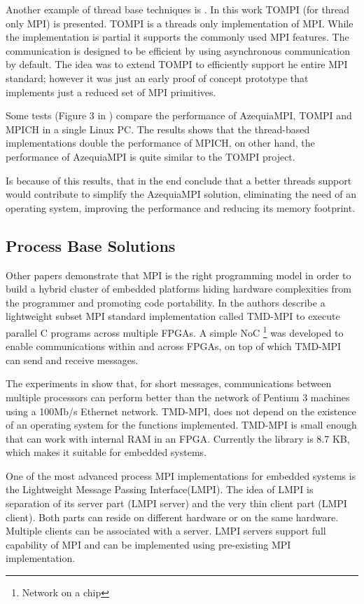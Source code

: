 Another example of thread base techniques is \cite{Demaine} . In this work
TOMPI (for thread only MPI) is presented. TOMPI is a threads only
implementation of MPI. While the implementation is partial it supports the
commonly used MPI features. The communication is designed to be efficient by
using asynchronous communication by default. The idea was to extend TOMPI to
efficiently support he entire MPI standard; however it was just an early proof
of concept prototype that implements just a reduced set of MPI primitives. 

Some tests (Figure 3 in \cite{Gallego}) compare the performance of AzequiaMPI,
TOMPI and MPICH in a single Linux PC. The results shows that the thread-based
implementations double the performance of MPICH, on other hand, the performance
of AzequiaMPI is quite similar to the TOMPI project. 

Is because of this results, that in the end \cite{Gallego} conclude that a better
threads support would contribute to simplify the AzequiaMPI solution,
eliminating the need of an operating system, improving the performance and
reducing its memory footprint. 

\subsection{Process Base Solutions}

Other papers \cite{Saldana-Chow} \cite{Williams} demonstrate that MPI is the
right programming model in order to build a hybrid cluster of embedded
platforms hiding hardware complexities from the programmer and promoting code
portability. In \cite{Saldana-Chow} the authors describe a lightweight subset
MPI standard implementation called TMD-MPI to execute parallel C programs
across multiple FPGAs. A simple NoC \footnote{Network on a chip} was developed
to enable communications within and across FPGAs, on top of which TMD-MPI can
send and receive messages. 

The experiments in \cite{Saldana-Chow}  show that, for short messages,
communications between multiple processors can perform better than the network
of Pentium 3 machines using a 100Mb/s Ethernet network. TMD-MPI, does not
depend on the existence of an operating system for the functions implemented.
TMD-MPI is small enough that can work with internal RAM in an FPGA. Currently
the library is 8.7 KB, which makes it suitable for embedded systems.

One of the most advanced process MPI implementations for embedded
systems is the Lightweight Message Passing Interface(LMPI)\cite{Abgaria}. The
idea of LMPI is separation of its server part (LMPI server) and the very thin
client part (LMPI client). Both parts can reside on different hardware or on
the same hardware. Multiple clients can be associated with a server. LMPI
servers support full capability of MPI and can be implemented using
pre-existing MPI implementation. 

